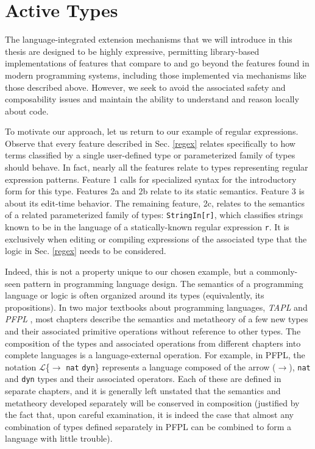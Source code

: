 \section{Active Types}\label{contributions}
The language-integrated extension mechanisms that we will introduce in this thesis are designed to be highly {expressive}, permitting library-based implementations of features that compare to and go beyond the features found in modern programming systems, including those implemented via mechanisms like those described above. However, we seek to avoid the associated {safety} and composability issues and  maintain the ability to understand and reason locally about code. %

To motivate our approach, let us return to our example of regular expressions. Observe that every feature described in Sec. \ref{regex} relates specifically to how terms  classified by a single user-defined type or parameterized family of types should behave. In fact, nearly all the features relate to types representing regular expression patterns. Feature 1 calls for specialized syntax for the introductory form for this type. Features 2a and 2b relate to its static semantics. Feature 3 is about its edit-time behavior. The remaining feature, 2c, relates to the semantics of a related parameterized family of types: \verb|StringIn[r]|, which classifies strings known to be in the language of a statically-known regular expression \verb|r|. It is exclusively when editing or compiling expressions of the associated type that the logic in Sec. \ref{regex}  needs to be considered. 

Indeed, this is not a property unique to our chosen example, but a commonly-seen pattern in programming language design. The semantics of a programming language or logic is often organized around its types (equivalently, its propositions). In two major textbooks about programming languages, \emph{TAPL} \cite{tapl} and \emph{PFPL} \cite{pfpl}, most chapters describe the semantics and metatheory of a few new types and their associated primitive operations without reference to other types. The composition of the types and associated operations from different chapters into complete languages is a language-external operation. For example, in PFPL, the notation $\mathcal{L}$\{$\rightarrow$ \verb|nat| \verb|dyn|\} represents a language composed of the arrow ($\rightarrow$), \verb|nat| and \verb|dyn| types and their associated operators. Each of these are defined in separate chapters, and it is generally left unstated that the semantics and metatheory developed separately will be conserved in composition (justified by the fact that, upon careful examination, it is indeed the case that almost any combination of types defined separately in PFPL can be combined to form a language with little trouble). 

